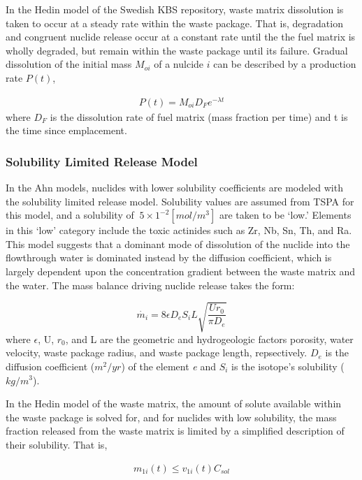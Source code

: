 In the Hedin model of the Swedish KBS repository, waste matrix 
dissolution is taken to occur at a steady rate within the waste 
package. That is, degradation and congruent nuclide release occur at a 
constant rate until the the fuel matrix is wholly degraded, but remain 
within the waste package until its failure. Gradual dissolution of the 
initial mass $M_{oi}$ of a nulcide $i$ can be described by a 
production rate $P(t)$,

\begin{align*}
  P(t) = M_{oi}D_Fe^{-\lambda t}
\end{align*}
where $D_F$ is the dissolution rate of fuel matrix (mass fraction per 
time) and t is the time since emplacement. 


\subsubsection{Solubility Limited Release Model}

In the Ahn models, nuclides with lower solubility coefficients are 
modeled with the solubility limited release model.  Solubility values 
are assumed from TSPA for this model, and a solubility of $~5\times 
1^{-2} [mol/m^3]$ are taken to be `low.' Elements in this `low' 
category include the toxic actinides such as Zr, Nb, Sn, Th, and Ra.  
This model suggests that a dominant mode of dissolution of the nuclide 
into the flowthrough water is dominated instead by the diffusion 
coefficient, which is largely dependent upon the concentration 
gradient between the waste matrix and the water. The mass balance 
driving nuclide release takes the form:

\begin{equation}
\dot{m_i}=8\epsilon D_eS_iL\sqrt{\frac{Ur_0}{\pi D_e}}
\end{equation}
where $\epsilon$, U, $r_0$, and L are the geometric and hydrogeologic 
factors porosity, water velocity, waste package radius, and waste 
package length, repsectively. $D_e$ is the diffusion coefficient 
($m^2/yr$) of the element \emph{e} and $S_i$ is the isotope's 
solubility ($kg/m^3$).

In the Hedin model of the waste matrix, the amount of solute available 
within the waste package is solved for, and for nuclides with low 
solubility, the mass fraction released from the waste matrix is 
limited by a simplified description of their solubility. That is, 

\begin{align*}
  m_{1i}(t)\le v_{1i}(t)C_{sol}
\end{align*}

